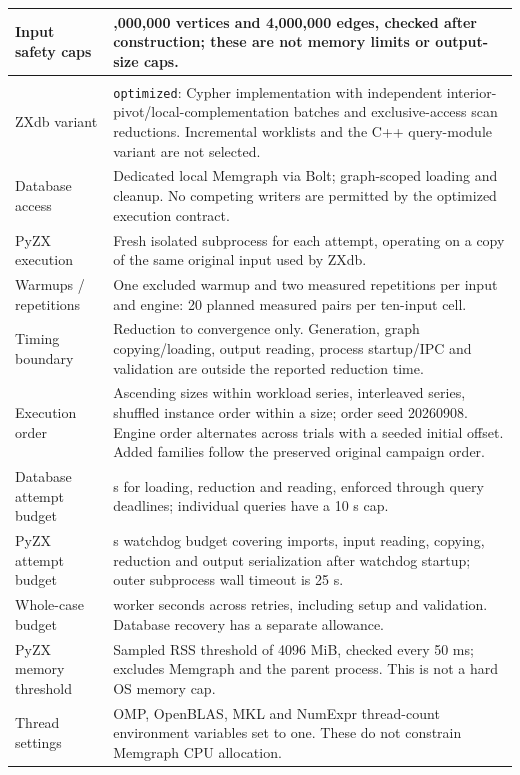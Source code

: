 \begin{longtable}{@{}>{\raggedright\arraybackslash}p{}>{\raggedright\arraybackslash}p{}@{}}
Input safety caps & 2,000,000 vertices and 4,000,000 edges, checked after construction; these are not memory limits or output-size caps. \\
\hline
\multicolumn{2}{l}{\textbf{Execution and resource limits}} \\
ZXdb variant & \texttt{optimized}: Cypher implementation with independent interior-pivot/local-complementation batches and exclusive-access scan reductions. Incremental worklists and the C++ query-module variant are not selected. \\
Database access & Dedicated local Memgraph via Bolt; graph-scoped loading and cleanup. No competing writers are permitted by the optimized execution contract. \\
PyZX execution & Fresh isolated subprocess for each attempt, operating on a copy of the same original input used by ZXdb. \\
Warmups / repetitions & One excluded warmup and two measured repetitions per input and engine: 20 planned measured pairs per ten-input cell. \\
Timing boundary & Reduction to convergence only. Generation, graph copying/loading, output reading, process startup/IPC and validation are outside the reported reduction time. \\
Execution order & Ascending sizes within workload series, interleaved series, shuffled instance order within a size; order seed 20260908. Engine order alternates across trials with a seeded initial offset. Added families follow the preserved original campaign order. \\
Database attempt budget & 15 s for loading, reduction and reading, enforced through query deadlines; individual queries have a 10 s cap. \\
PyZX attempt budget & 15 s watchdog budget covering imports, input reading, copying, reduction and output serialization after watchdog startup; outer subprocess wall timeout is 25 s. \\
Whole-case budget & 120 worker seconds across retries, including setup and validation. Database recovery has a separate allowance. \\
PyZX memory threshold & Sampled RSS threshold of 4096 MiB, checked every 50 ms; excludes Memgraph and the parent process. This is not a hard OS memory cap. \\
Thread settings & OMP, OpenBLAS, MKL and NumExpr thread-count environment variables set to one. These do not constrain Memgraph CPU allocation. \\

\end{longtable}
